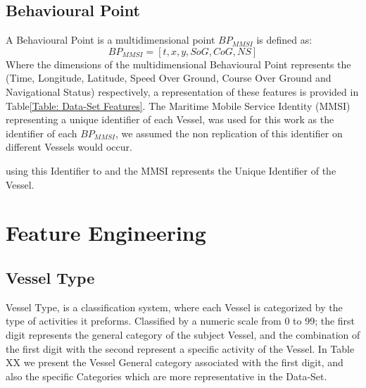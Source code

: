 \subsection{Behavioural Point}
\label{subsection: Behavioural Point}
A Behavioural Point is a multidimensional point $BP_{MMSI}$ is defined as:
\[BP_{MMSI} = [t, x, y, SoG, CoG, NS]\]
Where the dimensions of the multidimensional Behavioural Point represents the (Time, Longitude, Latitude, Speed Over Ground, Course Over Ground and Navigational Status) respectively, a representation of these features is provided in Table\ref{Table: Data-Set Features}. The Maritime Mobile Service Identity (MMSI) representing a unique identifier of each Vessel, was used for this work as the identifier of each $BP_{MMSI}$, we assumed the non replication of this identifier on different Vessels would occur.

using this Identifier to and the MMSI represents the Unique Identifier of the Vessel.



\section{Feature Engineering}
\subsection{Vessel Type}
Vessel Type, is a classification system, where each Vessel is categorized by the type of activities it preforms. Classified by a numeric scale from 0 to 99; the first digit represents the general category of the subject Vessel, and the combination of the first digit with the second represent a specific activity of the Vessel. In Table XX we present the Vessel General category associated with the first digit, and also the specific Categories which are more representative in the Data-Set.

